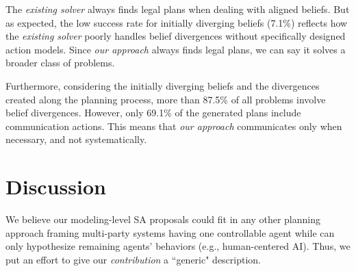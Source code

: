 \documentclass[letterpaper]{article} %
\begin{document}
The \textit{existing solver} always finds legal plans when dealing with aligned beliefs. But as expected, the low success rate for initially diverging beliefs (7.1\%) reflects how the \textit{existing solver} poorly handles belief divergences without specifically designed action models. Since \textit{our approach} always finds legal plans, we can say it solves a broader class of problems.

Furthermore, considering the initially diverging beliefs and the divergences created along the planning process, more than 87.5\% of all problems involve belief divergences. 
However, only 69.1\% of the generated plans include communication actions. This means that \textit{our approach} communicates only when necessary, and not systematically.   

\section{Discussion} 
\label{sec:disc-conc}


We believe our modeling-level SA proposals could fit in any other planning approach framing multi-party systems having one controllable agent while can only hypothesize remaining agents' behaviors  (e.g., human-centered AI). Thus, we put an effort to give our \textit{contribution} a ``generic" description.
\end{document}
